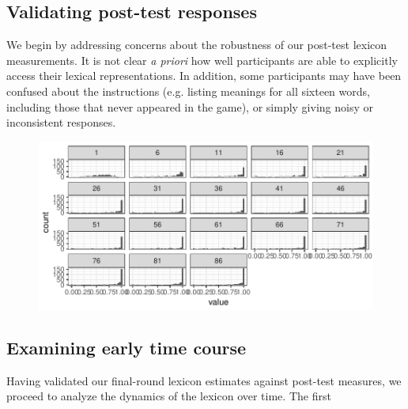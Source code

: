 \documentclass[10pt,letterpaper]{article}
\begin{document}
\subsection{Validating post-test responses}

We begin by addressing concerns about the robustness of our post-test lexicon measurements. It is not clear \emph{a priori} how well participants are able to explicitly access their lexical representations. In addition, some participants may have been confused about the instructions (e.g. listing meanings for all sixteen words, including those that never appeared in the game), or simply giving noisy or inconsistent responses. 



\begin{figure}[t]
\begin{center}
{\includegraphics[scale=.55]{wordFormationExample.pdf}}
{\caption{{\footnotesize {}  \label{fig:modelSchematic}}}}
\end{center}
\end{figure}


\subsection{Examining early time course}

Having validated our final-round lexicon estimates against post-test measures, we proceed to analyze the dynamics of the lexicon over time. The first 
\end{document}

